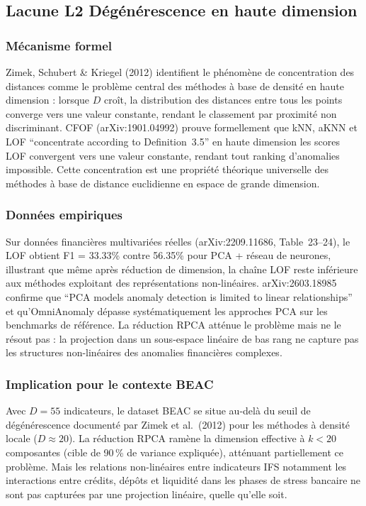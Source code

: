 \documentclass[12pt,a4paper]{article}
\begin{document}
\subsection{Lacune L2  Dégénérescence en haute dimension}

\subsubsection{Mécanisme formel}

Zimek, Schubert \& Kriegel (2012) identifient le phénomène de concentration
des distances comme le problème central des méthodes à base de densité en
haute dimension : lorsque $D$ croît, la distribution des distances entre
tous les points converge vers une valeur constante, rendant le classement
par proximité non discriminant. CFOF (arXiv:1901.04992) prouve formellement
que kNN, aKNN et LOF ``concentrate according to Definition~3.5'' en haute
dimension  les scores LOF convergent vers une valeur constante, rendant
tout ranking d'anomalies impossible. Cette concentration est une propriété
théorique universelle des méthodes à base de distance euclidienne en espace
de grande dimension.

\subsubsection{Données empiriques}

Sur données financières multivariées réelles (arXiv:2209.11686, Table~23--24),
le LOF obtient F1 = 33.33\% contre 56.35\% pour PCA + réseau de neurones,
illustrant que même après réduction de dimension, la chaîne LOF reste inférieure
aux méthodes exploitant des représentations non-linéaires. arXiv:2603.18985
confirme que ``PCA models anomaly detection is limited to linear relationships''
et qu'OmniAnomaly dépasse systématiquement les approches PCA sur les benchmarks
de référence. La réduction RPCA atténue le problème mais ne le résout pas :
la projection dans un sous-espace linéaire de bas rang ne capture pas les
structures non-linéaires des anomalies financières complexes.

\subsubsection{Implication pour le contexte BEAC}

Avec $D = 55$ indicateurs, le dataset BEAC se situe au-delà du seuil de
dégénérescence documenté par Zimek et al.\ (2012) pour les méthodes à densité
locale ($D \approx 20$). La réduction RPCA ramène la dimension effective
à $k < 20$ composantes (cible de 90\,\% de variance expliquée), atténuant
partiellement ce problème. Mais les relations non-linéaires entre indicateurs
IFS  notamment les interactions entre crédits, dépôts et liquidité dans
les phases de stress bancaire  ne sont pas capturées par une projection
linéaire, quelle qu'elle soit.
\end{document}
